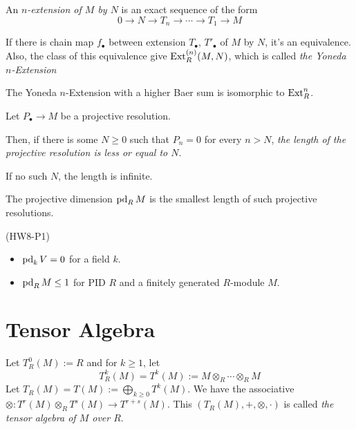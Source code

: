 \documentclass{article}
\begin{document}
\begin{definition}
  An \emph{\(n\)-extension of \(M\) by \(N\)} is an exact sequence of the form
  \[0 \to N \to T_n \to \cdots \to T_1 \to M\]
\end{definition}

\begin{definition}
  If there is chain map \(f_\bullet\) between extension \(T_\bullet\), \(T'_\bullet\) of \(M\) by \(N\),
  it's an equivalence.
  Also, the class of this equivalence give \(\textnormal{Ext}_R^{(n)}(M, N)\), which is
  called \emph{the Yoneda \(n\)-Extension}
\end{definition}

\begin{theorem}
  The Yoneda \(n\)-Extension with a higher Baer sum is isomorphic to \(\textnormal{Ext}_R^n\).
\end{theorem}

\begin{definition}
  Let \(P_\bullet \to M\) be a projective resolution.

  Then, if there is some \(N \ge 0\) such that \(P_n = 0\) for every \(n > N\),
  \emph{the length of the projective resolution is less or equal to \(N\)}.

  If no such \(N\), the length is infinite.

  The projective dimension \(\operatorname{pd}_R M\) is the smallest length of such projective resolutions.
\end{definition}

\begin{theorem}(HW8-P1)

  \begin{itemize}
  \item \(\operatorname{pd}_k V = 0\) for a field \(k\).
  \item \(\operatorname{pd}_R M \le 1\) for PID \(R\) and a finitely generated \(R\)-module \(M\).
  \end{itemize}
\end{theorem}

\section*{Tensor Algebra}

\begin{definition}
  Let \(T_R^0(M) := R\) and for \(k \ge 1\), let
  \[T_R^k(M) = T^k(M) := M \otimes_R \cdots \otimes_R M\]
  Let \(T_R(M) = T(M) := \bigoplus_{k \ge 0} T^k(M)\).
  We have the associative \(\otimes: T^r(M) \otimes_R T^s(M) \to T^{r + s}(M)\).
  This \((T_R(M), +, \otimes, \cdot)\) is called \emph{the tensor algebra of \(M\) over \(R\)}.
\end{definition}
\end{document}
